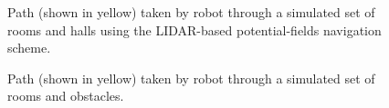 				\begin{figure}[!h]
					\centering
					\caption{Path (shown in yellow) taken by robot through a simulated set of rooms and halls using the LIDAR-based potential-fields navigation scheme.}
					\label{fig::potential_field_results}
				\end{figure}
				\begin{figure}[!h]
					\centering
					\caption{Path (shown in yellow) taken by robot through a simulated set of rooms and obstacles.}
					\label{fig::potential_field_results_obstacles}
				\end{figure}
		
